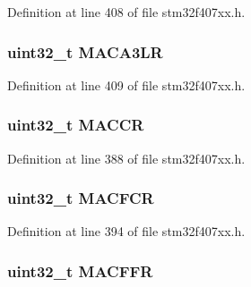 Definition at line 408 of file stm32f407xx.\+h.

\subsubsection[{\texorpdfstring{M\+A\+C\+A3\+LR}{MACA3LR}}]{ uint32\+\_\+t M\+A\+C\+A3\+LR}\hypertarget{struct_e_t_h___type_def_a2ba9f73c7fa756305d54a8f80872c6df}{}\label{struct_e_t_h___type_def_a2ba9f73c7fa756305d54a8f80872c6df}


Definition at line 409 of file stm32f407xx.\+h.

\subsubsection[{\texorpdfstring{M\+A\+C\+CR}{MACCR}}]{ uint32\+\_\+t M\+A\+C\+CR}\hypertarget{struct_e_t_h___type_def_a20acbcac1c35f66de94c9ff0e2ddc7b0}{}\label{struct_e_t_h___type_def_a20acbcac1c35f66de94c9ff0e2ddc7b0}


Definition at line 388 of file stm32f407xx.\+h.

\subsubsection[{\texorpdfstring{M\+A\+C\+F\+CR}{MACFCR}}]{ uint32\+\_\+t M\+A\+C\+F\+CR}\hypertarget{struct_e_t_h___type_def_a12f62d3d3b9ee30c20c324b146e72795}{}\label{struct_e_t_h___type_def_a12f62d3d3b9ee30c20c324b146e72795}


Definition at line 394 of file stm32f407xx.\+h.

\subsubsection[{\texorpdfstring{M\+A\+C\+F\+FR}{MACFFR}}]{ uint32\+\_\+t M\+A\+C\+F\+FR}\hypertarget{struct_e_t_h___type_def_a8ad4e3dbde1518ecde5d979c2a89a76a}{}\label{struct_e_t_h___type_def_a8ad4e3dbde1518ecde5d979c2a89a76a}


